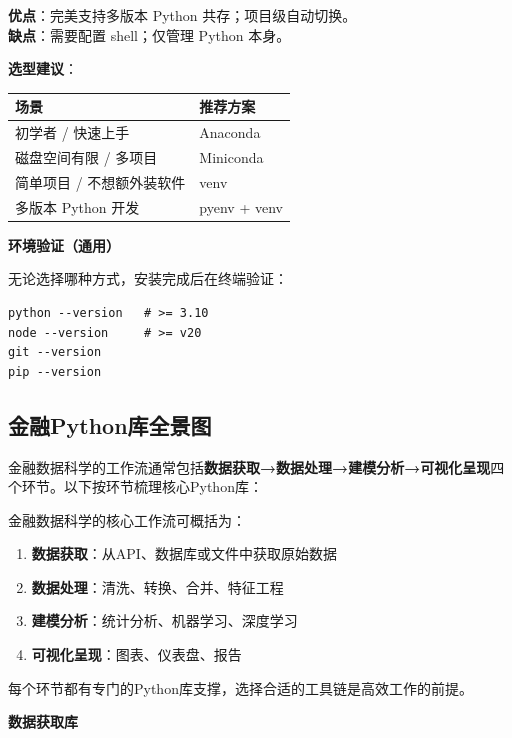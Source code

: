 \textbf{优点}：完美支持多版本 Python 共存；项目级自动切换。\\
\textbf{缺点}：需要配置 shell；仅管理 Python 本身。

\textbf{选型建议}：

\begin{table}[H]
\centering
\begin{tabular}{ll}
\toprule
\textbf{场景} & \textbf{推荐方案} \\
\midrule
初学者 / 快速上手 & Anaconda \\
磁盘空间有限 / 多项目 & Miniconda \\
简单项目 / 不想额外装软件 & venv \\
多版本 Python 开发 & pyenv + venv \\
\bottomrule
\end{tabular}
\end{table}

\textbf{环境验证（通用）}

无论选择哪种方式，安装完成后在终端验证：

\begin{lstlisting}[style=shell]
python --version   # >= 3.10
node --version     # >= v20
git --version
pip --version
\end{lstlisting}

\subsection{金融Python库全景图}

金融数据科学的工作流通常包括\textbf{数据获取→数据处理→建模分析→可视化呈现}四个环节。以下按环节梳理核心Python库：

\begin{theorybox}[金融数据科学工作流与工具链]
金融数据科学的核心工作流可概括为：
\begin{enumerate}[leftmargin=2em]
  \item \textbf{数据获取}：从API、数据库或文件中获取原始数据
  \item \textbf{数据处理}：清洗、转换、合并、特征工程
  \item \textbf{建模分析}：统计分析、机器学习、深度学习
  \item \textbf{可视化呈现}：图表、仪表盘、报告
\end{enumerate}
每个环节都有专门的Python库支撑，选择合适的工具链是高效工作的前提。
\end{theorybox}

\textbf{数据获取库}

